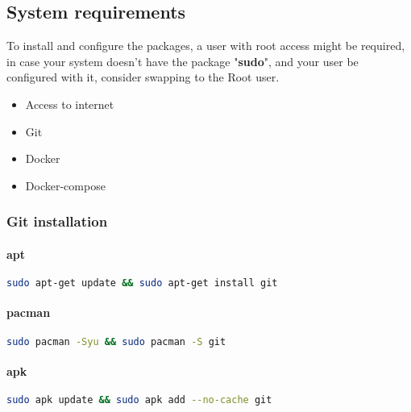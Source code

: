 \subsection{System requirements}\label{subsec:system-requirements}
\begin{flushleft}
    To install and configure the packages, a user with root access might be required, in case your system doesn't have the package
    "\textbf{sudo}", and your user be configured with it, consider swapping to the Root user.
\end{flushleft}

\begin{itemize}
    \item Access to internet
    \item Git
    \item Docker
    \item Docker-compose
\end{itemize}

\subsubsection{Git installation}
\paragraph{apt}
\begin{flushleft}
\begin{lstlisting}[language=bash,label={lst:apt-git}]
sudo apt-get update && sudo apt-get install git
\end{lstlisting}
\end{flushleft}

\paragraph{pacman}
\begin{flushleft}
\begin{lstlisting}[language=bash,label={lst:pacman-git}]
sudo pacman -Syu && sudo pacman -S git
\end{lstlisting}
\end{flushleft}

\paragraph{apk}
\begin{flushleft}
\begin{lstlisting}[language=bash,label={lst:apk-git}]
sudo apk update && sudo apk add --no-cache git
\end{lstlisting}
\end{flushleft}


